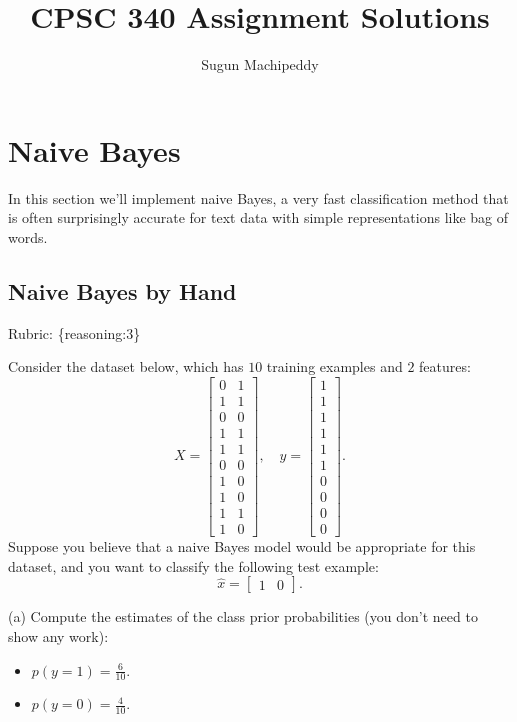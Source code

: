 \documentclass{article}
\def\blu#1{{\color{blu}#1}}
\def\gre#1{{\color{gre}#1}}
\def\items#1{\begin{itemize}#1\end{itemize}}
\def\rubric#1{\gre{Rubric: \{#1\}}}{}
\begin{document}
\title{CPSC 340 Assignment Solutions}
\author{Sugun Machipeddy}
\date{}
\maketitle
\vspace{-4em}



\section{Naive Bayes}

In this section we'll implement naive Bayes, a very fast classification method that is often surprisingly accurate for text data with simple representations like bag of words.



\subsection{Naive Bayes by Hand}
\rubric{reasoning:3}

Consider the dataset below, which has $10$ training examples and $2$ features:
\[
X = \begin{bmatrix}0 & 1\\1 & 1\\ 0 & 0\\ 1 & 1\\ 1 & 1\\ 0 & 0\\  1 & 0\\  1 & 0\\  1 & 1\\  1 &0\end{bmatrix}, \quad y = \begin{bmatrix}1\\1\\1\\1\\1\\1\\0\\0\\0\\0\end{bmatrix}.
\]
Suppose you believe that a naive Bayes model would be appropriate for this dataset, and you want to classify the following test example:
\[
\hat{x} = \begin{bmatrix}1 & 0\end{bmatrix}.
\]

\blu{(a) Compute the estimates of the class prior probabilities} (you don't need to show any work):
\items{
\item$ p(y = 1) = \frac{6}{10}$.
\item $p(y = 0) = \frac{4}{10}$.
}
\end{document}
